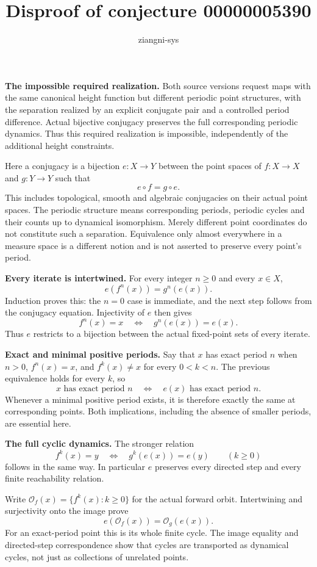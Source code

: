 \documentclass[11pt]{article}
\title{Disproof of conjecture 00000005390}
\author{ziangni-sys}
\date{}
\begin{document}
\maketitle
\noindent\textbf{The impossible required realization.}
Both source versions request maps with the same canonical height function but different periodic point structures, with the separation realized by an explicit conjugate pair and a controlled period difference. Actual bijective conjugacy preserves the full corresponding periodic dynamics. Thus this required realization is impossible, independently of the additional height constraints.

Here a conjugacy is a bijection $e:X\to Y$ between the point spaces of $f:X\to X$ and $g:Y\to Y$ such that
\[
 e\circ f=g\circ e.
\]
This includes topological, smooth and algebraic conjugacies on their actual point spaces. The periodic structure means corresponding periods, periodic cycles and their counts up to dynamical isomorphism. Merely different point coordinates do not constitute such a separation. Equivalence only almost everywhere in a measure space is a different notion and is not asserted to preserve every point's period.

\medskip
\noindent\textbf{Every iterate is intertwined.}
For every integer $n\ge0$ and every $x\in X$,
\[
 e(f^n(x))=g^n(e(x)).
\]
Induction proves this: the $n=0$ case is immediate, and the next step follows from the conjugacy equation. Injectivity of $e$ then gives
\[
 f^n(x)=x\quad\Longleftrightarrow\quad g^n(e(x))=e(x).
\]
Thus $e$ restricts to a bijection between the actual fixed-point sets of every iterate.

\medskip
\noindent\textbf{Exact and minimal positive periods.}
Say that $x$ has exact period $n$ when $n>0$, $f^n(x)=x$, and
$f^k(x)\ne x$ for every $0<k<n$. The previous equivalence holds for every $k$, so
\[
 x\text{ has exact period }n
 \quad\Longleftrightarrow\quad
 e(x)\text{ has exact period }n.
\]
Whenever a minimal positive period exists, it is therefore exactly the same at corresponding points. Both implications, including the absence of smaller periods, are essential here.

\medskip
\noindent\textbf{The full cyclic dynamics.}
The stronger relation
\[
 f^k(x)=y\quad\Longleftrightarrow\quad
 g^k(e(x))=e(y)
 \qquad(k\ge0)
\]
follows in the same way. In particular $e$ preserves every directed step and every finite reachability relation.

Write $\mathcal O_f(x)=\{f^k(x):k\ge0\}$ for the actual forward orbit. Intertwining and surjectivity onto the image prove
\[
 e(\mathcal O_f(x))=\mathcal O_g(e(x)).
\]
For an exact-period point this is its whole finite cycle. The image equality and directed-step correspondence show that cycles are transported as dynamical cycles, not just as collections of unrelated points.
\end{document}
